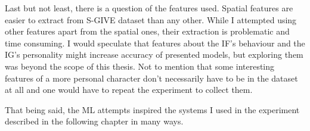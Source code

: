 Last but not least, there is a question of the features used. Spatial features are easier to extract from S-GIVE dataset than any other. While I attempted using other features apart from the spatial ones, their extraction is problematic and time consuming. I would speculate that features about the IF's behaviour and the IG's personality might increase accuracy of presented models, but exploring them was beyond the scope of this thesis. Not to mention that some interesting features of a more personal character don't necessarily have to be in the dataset at all and one would have to repeat the experiment to collect them.

That being said, the ML attempts inspired the systems I used in the experiment described in the following chapter in many ways. 




